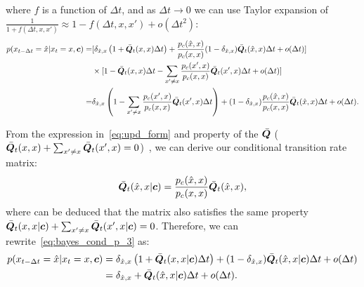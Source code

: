 where $f$ is a function of $\Delta t$, and as $\Delta t\rightarrow0$ we can use  Taylor expansion of $\frac{1} {1+f({\Delta t,x,x'})} \approx1-f({\Delta t,x,x'})+o ( \Delta t^{2} )$:
\begin{equation}
\label{eq:bayes_cond_p_3}
\begin{aligned}
p ( x_{t-\Delta t} =\hat{x} | x_{t}=x, \bm{c} )   =&[\delta_{\hat{x}, x}\left(1+\bar{{\bm{Q}}}_t(x,x)\Delta t \right) + \frac{p_c(\hat{x},x)}{p_c(x,x)} (1-\delta_{\hat{x}, x})\bar{{\bm{Q}}}_t(\hat{x},x)\Delta t + o(\Delta t)]\\
&\times [1-\bar{{\bm{Q}}}_t(x,x)\Delta t - \sum_{x'\neq x}\frac{p_c({x'},x)}{p_c(x,x)}\bar{{\bm{Q}}}_t({x'},x)\Delta t + o(\Delta t)]\\
 =& \delta_{\hat{x}, x}\left(1 -  \sum_{x'\neq x} \frac{p_c({x'},x)}{p_c(x,x)}\bar{{\bm{Q}}}_t({x'},x)\Delta t\right) + (1-\delta_{\hat{x}, x})\frac{p_c(\hat{x},x)}{p_c(x,x)} \bar{{\bm{Q}}}_t(\hat{x},x)\Delta t + o(\Delta t). 
\end{aligned}
\end{equation}

From the expression in~\cref{eq:upd_form} and property of the $\bar{{\bm{Q}}}$ (\ie~$\bar{{\bm{Q}}}_t(x,x) + \sum_{x'\neq x}\bar{{\bm{Q}}}_t(x',x)=0$)~\cite{SEDD:conf/icml/LouME24}, we can derive our conditional transition rate matrix:
\begin{equation}
\label{eq:q_cond_matrix}
\begin{aligned}
\bar{{\bm{Q}}}_t(\hat{x},x|\bm{c}) = \frac{p_c(\hat{x},x)}{p_c(x,x)} \bar{{\bm{Q}}}_t(\hat{x},x),
\end{aligned}
\end{equation}
where can be deduced that the matrix also satisfies the same property $\bar{{\bm{Q}}}_t(x,x|\bm{c}) + \sum_{x'\neq x}\bar{{\bm{Q}}}_t(x',x|\bm{c})=0$. Therefore, we can rewrite~\cref{eq:bayes_cond_p_3} as:
\begin{equation}
\label{eq:bayes_cond_p_4}
\begin{aligned}
p ( x_{t-\Delta t} =\hat{x} | x_{t}=x, \bm{c} )  & = \delta_{\hat{x}, x}\left(1 + \bar{{\bm{Q}}}_t(x,x|\bm{c})\Delta t\right) + (1-\delta_{\hat{x}, x})\bar{{\bm{Q}}}_t(\hat{x},x|\bm{c})\Delta t + o(\Delta t)\\
& = \delta_{\hat{x}, x} + \bar{{\bm{Q}}}_t(\hat{x},x|\bm{c})\Delta t + o(\Delta t).
\end{aligned}
\end{equation}


